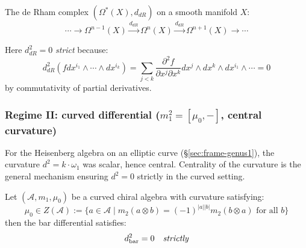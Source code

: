 \begin{example}
The de Rham complex $(\Omega^*(X), d_{dR})$ on a smooth manifold $X$:
\[\cdots \to \Omega^{n-1}(X) \xrightarrow{d_{dR}} \Omega^n(X) \xrightarrow{d_{dR}} 
\Omega^{n+1}(X) \to \cdots\]

Here $d_{dR}^2 = 0$ \emph{strict} because:
\[d_{dR}^2(f dx^{i_1} \wedge \cdots \wedge dx^{i_k}) 
= \sum_{j < k} \frac{\partial^2 f}{\partial x^j \partial x^k} dx^j \wedge dx^k \wedge dx^{i_1} 
\wedge \cdots = 0\]
by commutativity of partial derivatives.

\end{example}

\subsubsection{\texorpdfstring{Regime II: curved differential ($m_1^2 = [\mu_0, -]$, central curvature)}{Regime II: curved differential (m1 squared = commutator with mu0, central curvature)}}

\label{def:curved-ainfty-complete}

\begin{theorem}\label{thm:central-implies-strict}
For the Heisenberg algebra on an elliptic curve (\S\ref{sec:frame-genus1}), the curvature $d^2 = k \cdot \omega_1$ was scalar, hence central.  Centrality of the curvature is the general mechanism ensuring $d^2 = 0$ strictly in the curved setting.

Let $(\mathcal{A}, m_1, \mu_0)$ be a curved chiral algebra with curvature satisfying:
\begin{equation}
\mu_0 \in Z(\mathcal{A}) := \{a \in \mathcal{A} \mid m_2(a \otimes b) = (-1)^{|a||b|}m_2(b \otimes a)
\text{ for all } b\}
\end{equation}
then the bar differential satisfies:
\begin{equation}
d_{\text{bar}}^2 = 0 \quad \emph{strictly}
\end{equation}
\end{theorem}

